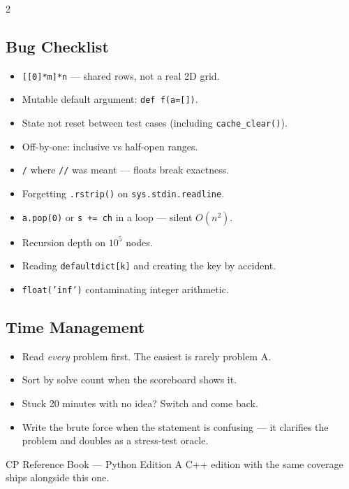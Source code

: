 \documentclass[10pt]{article}
\newcommand{\code}[1]{\texttt{\small #1}}
\begin{document}
\begin{multicols}{2}
\subsection{Bug Checklist}
\begin{itemize}
    \item \code{[[0]*m]*n} --- shared rows, not a real 2D grid.
    \item Mutable default argument: \code{def f(a=[])}.
    \item State not reset between test cases (including
          \code{cache\_clear()}).
    \item Off-by-one: inclusive vs half-open ranges.
    \item \code{/} where \code{//} was meant --- floats break exactness.
    \item Forgetting \code{.rstrip()} on \code{sys.stdin.readline}.
    \item \code{a.pop(0)} or \code{s += ch} in a loop --- silent $O(n^2)$.
    \item Recursion depth on $10^5$ nodes.
    \item Reading \code{defaultdict[k]} and creating the key by accident.
    \item \code{float('inf')} contaminating integer arithmetic.
\end{itemize}

\subsection{Time Management}
\begin{itemize}
    \item Read \emph{every} problem first. The easiest is rarely
          problem A.
    \item Sort by solve count when the scoreboard shows it.
    \item Stuck 20 minutes with no idea? Switch and come back.
    \item Write the brute force when the statement is confusing --- it
          clarifies the problem and doubles as a stress-test oracle.
\end{itemize}

\end{multicols}

\vfill
\begin{center}
{\footnotesize\color{cmt}
CP Reference Book --- Python Edition \quad\textbullet\quad
A C++ edition with the same coverage ships alongside this one.\par}
\end{center}
\end{document}
